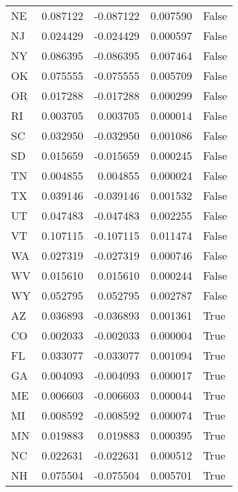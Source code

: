 \begin{table}
\begin{tabular}{lrrrl}
      NE &   0.087122 & -0.087122 &       0.007590 &         False \\
      NJ &   0.024429 & -0.024429 &       0.000597 &         False \\
      NY &   0.086395 & -0.086395 &       0.007464 &         False \\
      OK &   0.075555 & -0.075555 &       0.005709 &         False \\
      OR &   0.017288 & -0.017288 &       0.000299 &         False \\
      RI &   0.003705 &  0.003705 &       0.000014 &         False \\
      SC &   0.032950 & -0.032950 &       0.001086 &         False \\
      SD &   0.015659 & -0.015659 &       0.000245 &         False \\
      TN &   0.004855 &  0.004855 &       0.000024 &         False \\
      TX &   0.039146 & -0.039146 &       0.001532 &         False \\
      UT &   0.047483 & -0.047483 &       0.002255 &         False \\
      VT &   0.107115 & -0.107115 &       0.011474 &         False \\
      WA &   0.027319 & -0.027319 &       0.000746 &         False \\
      WV &   0.015610 &  0.015610 &       0.000244 &         False \\
      WY &   0.052795 &  0.052795 &       0.002787 &         False \\
      AZ &   0.036893 & -0.036893 &       0.001361 &          True \\
      CO &   0.002033 & -0.002033 &       0.000004 &          True \\
      FL &   0.033077 & -0.033077 &       0.001094 &          True \\
      GA &   0.004093 & -0.004093 &       0.000017 &          True \\
      ME &   0.006603 & -0.006603 &       0.000044 &          True \\
      MI &   0.008592 & -0.008592 &       0.000074 &          True \\
      MN &   0.019883 &  0.019883 &       0.000395 &          True \\
      NC &   0.022631 & -0.022631 &       0.000512 &          True \\
      NH &   0.075504 & -0.075504 &       0.005701 &          True \\

\end{tabular}
\end{table}
